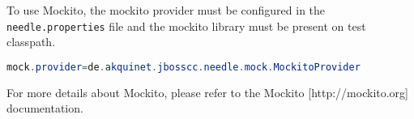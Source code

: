 To use Mockito, the mockito provider must be configured in the \verb|needle.properties| file and the mockito library must be present on test classpath.

\begin{lstlisting}[language={JAVA},caption=Mockito configuration]
mock.provider=de.akquinet.jbosscc.needle.mock.MockitoProvider
\end{lstlisting}

For more details about Mockito, please refer to the Mockito [http://mockito.org] documentation.
